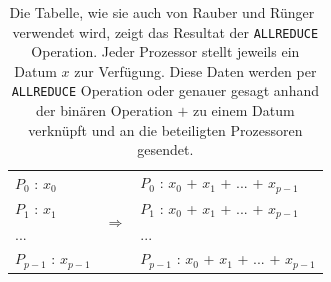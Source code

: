 \documentclass[11pt,a4paper]{article}
\begin{document}
\begin{table}[h]
\centering
\label{tbl:allreduce}
\begin{tabular}{lcl}
$P_{0}$ : $x_{0}$     		& \multirow{4}{*}{$\Rightarrow$} 	& $P_{0}$ : $x_{0}$ + $x_{1}$ + ... + $x_{p-1}$ \\
$P_{1}$ : $x_{1}$     		&                                 						& $P_{1}$ : $x_{0}$ + $x_{1}$ + ... + $x_{p-1}$ \\
...         			&                                 									& ... \\
$P_{p-1}$ : $x_{p-1}$ 	&                                 						& $P_{p-1}$ : $x_{0}$ + $x_{1}$ + ... + $x_{p-1}$
\end{tabular}
\caption{Die Tabelle, wie sie auch von Rauber und Rünger~\cite{rauber} verwendet wird, zeigt das Resultat der \lstinline{ALLREDUCE} Operation. Jeder Prozessor stellt jeweils ein Datum $x$ zur Verfügung. Diese Daten werden per \lstinline{ALLREDUCE} Operation oder genauer gesagt anhand der binären Operation $+$ zu einem Datum verknüpft und an die beteiligten Prozessoren gesendet.}
\end{table}
\end{document}
